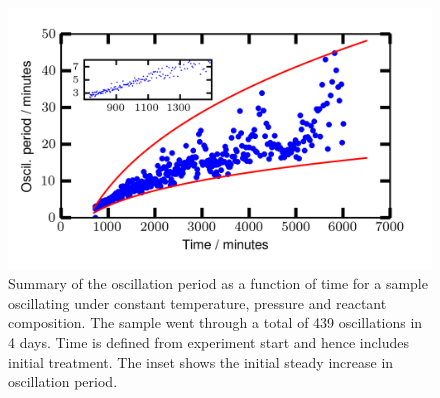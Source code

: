 \documentclass[journal=jacsat,manuscript=article]{achemso}
\begin{document}
\begin{figure}
  \includegraphics[width=12cm]{summary_of_long_measurement.png}
  \caption{Summary of the oscillation period as a function of time for a sample
  oscillating under constant temperature, pressure and reactant composition.
  The sample went through a total of 439 oscillations in 4 days. Time is
  defined from experiment start and hence includes initial treatment. The inset
  shows the initial steady increase in oscillation period.}
  \label{fgr:long_measurement}
\end{figure}
  
\end{document}
